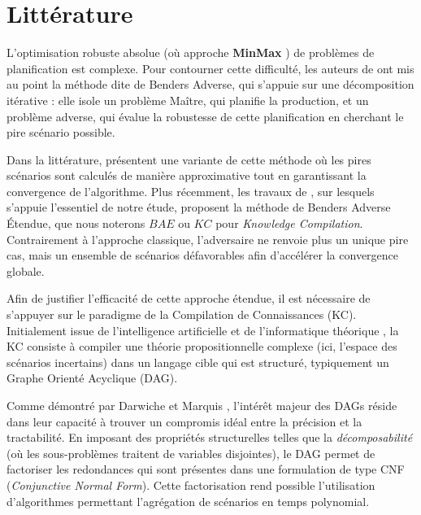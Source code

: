 \documentclass[12pt, a4paper, twoside]{report}
\numberwithin{equation}{section}
\newcommand{\mmx}{\textbf{MinMax} }
\begin{document}
	\clearpage
	\section{Littérature}
	
	L'optimisation robuste absolue (où approche \mmx) de problèmes de planification est complexe. Pour contourner cette difficulté, les auteurs de \cite{JFBENDERS} ont mis au point la méthode dite de Benders Adverse, qui s'appuie sur une décomposition itérative : elle isole un problème Maître, qui planifie la production, et un problème adverse, qui évalue la robustesse de cette planification en cherchant le pire scénario possible.
	
	Dans la littérature, \cite{PATZOLD202020} présentent une variante de cette méthode où les pires scénarios sont calculés de manière approximative tout en garantissant la convergence de l'algorithme. Plus récemment, les travaux de \cite{portoleauROADEF}, sur lesquels s'appuie l'essentiel de notre étude, proposent la méthode de Benders Adverse Étendue, que nous noterons $BAE$ ou $KC$ pour \textit{Knowledge Compilation}. Contrairement à l'approche classique, l'adversaire ne renvoie plus un unique pire cas, mais un ensemble de scénarios défavorables afin d'accélérer la convergence globale. 

    Afin de justifier l'efficacité de cette approche étendue, il est nécessaire de s'appuyer sur le paradigme de la Compilation de Connaissances (KC). Initialement issue de l'intelligence artificielle et de l'informatique théorique \cite{Darwiche_2002}, la KC consiste à compiler une théorie propositionnelle complexe (ici, l'espace des scénarios incertains) dans un langage cible qui est structuré, typiquement un Graphe Orienté Acyclique (DAG). 
    
    Comme démontré par Darwiche et Marquis \cite{Darwiche_2002}, l'intérêt majeur des DAGs réside dans leur capacité à trouver un compromis idéal entre la précision et la tractabilité. En imposant des propriétés structurelles telles que la \textit{décomposabilité} (où les sous-problèmes traitent de variables disjointes), le DAG permet de factoriser les redondances qui sont présentes dans une formulation de type CNF (\textit{Conjunctive Normal Form}). Cette factorisation rend possible l'utilisation d'algorithmes permettant l'agrégation de scénarios en temps polynomial. %
    
\end{document}
